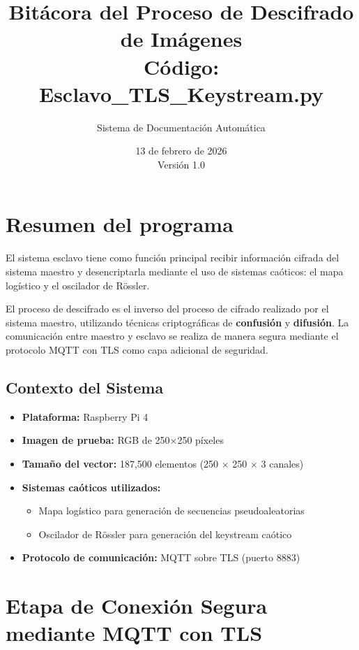 \documentclass[12pt,a4paper]{article}
\title{\textbf{Bitácora del Proceso de Descifrado de Imágenes}\\
	\large{Código: Esclavo\_TLS\_Keystream.py}}
\author{Sistema de Documentación Automática}
\date{13 de febrero de 2026 \\ Versión 1.0}
\begin{document}
	
	\maketitle
	\thispagestyle{empty}
	
	\newpage
	\tableofcontents
	\newpage
	
	\section{Resumen del programa}
	
	El sistema esclavo tiene como función principal recibir información cifrada del sistema maestro y desencriptarla mediante el uso de sistemas caóticos: el mapa logístico y el oscilador de Rössler.
	
	El proceso de descifrado es el inverso del proceso de cifrado realizado por el sistema maestro, utilizando técnicas criptográficas de \textbf{confusión} y \textbf{difusión}. La comunicación entre maestro y esclavo se realiza de manera segura mediante el protocolo MQTT con TLS como capa adicional de seguridad.
	
	\subsection{Contexto del Sistema}
	
	\begin{itemize}
		\item \textbf{Plataforma:} Raspberry Pi 4
		\item \textbf{Imagen de prueba:} RGB de 250×250 píxeles
		\item \textbf{Tamaño del vector:} 187,500 elementos (250 × 250 × 3 canales)
		\item \textbf{Sistemas caóticos utilizados:}
		\begin{itemize}
			\item Mapa logístico para generación de secuencias pseudoaleatorias
			\item Oscilador de Rössler para generación del keystream caótico
		\end{itemize}
		\item \textbf{Protocolo de comunicación:} MQTT sobre TLS (puerto 8883)
	\end{itemize}
	
	\section{Etapa de Conexión Segura mediante MQTT con TLS}
	
\end{document}
